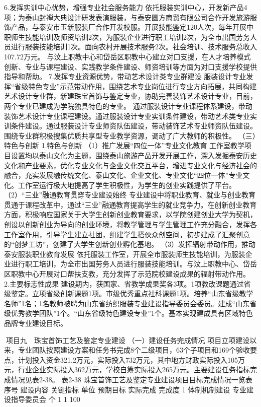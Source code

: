 6.发挥实训中心优势，增强专业社会服务能力
依托服装实训中心，开发新产品4项；为泰山封禅大典设计研发表演服装，与泰安圆方商贸有限公司合作开发旅游服饰产品，与泰安市玉新服装厂合作开发校服。开展技能鉴定120人次，每年开展中职师生技能培训及师资培训2次，为服装企业进行职工培训2次，为全市出国劳务人员进行服装技能培训1次。面向农村开展技术服务2次。社会培训、技术服务总收入107.72万元。
与汶上职教中心和岱岳区职教中心建立对口支援，在人才培养模式创新、专业与课程建设、实践教学条件建设、师资培训等方面为对口支援学校提供指导和帮助。
7.发挥专业资源优势，带动艺术设计类专业群建设
服装设计专业发挥“省级特色专业”示范带动作用，围绕艺术专业岗位进行专业方向拓展，共同构建艺术设计专业群，新建珠宝首饰与鉴定专业，协助完善装饰艺术设计专业，目前，两个专业已建成为学院独具特色的专业。
通过服装设计专业课程体系建设，带动装饰艺术设计专业课程建设。通过服装设计专业实训条件建设，带动艺术类专业实训条件建设。通过服装设计专业师资队伍建设，带动装饰艺术专业师资队伍建设。围绕专业群积极搜集优质共享型专业教学资源，调动了广大教师的积极性。
（三）特色与创新
1.特色与创新
（1）推广发展“四位一体”专业文化教育
工作室教学项目设置均以泰山文化为主题，围绕泰山旅游产品开发开展工作，深入发掘泰安历史文化和产业要素，优化专业文化与企业文化交互平台，增进专业文化与经济社会的融合，充实发展融传统文化、泰山文化、企业文化、专业文化“四位一体”专业文化。工作室运行极大地提高了学生积极性，为学生的创业实践提供了平台。
（2）“三业”融通教育贯穿专业建设始终
专业建设中将职业教育、就业与创业教育贯通于课程改革中，通过“三业”融通教育提高学生的就业竞争力。在创新创业教育方面，积极响应国家关于大学生创新创业教育要求，以学院创建创业大学为契机，创设以创新创业为导向的创业环境，将教学管理与学生管理工作充分融合，发挥各工作室作用，引导学生建立社团，组建学生搭伙众创空间，初步建成了汇聚创意的“创梦工坊”，创建了大学生创新创业孵化基地。
（3）发挥辐射带动作用，推动泰安服装职业教育发展
依托服装工作室，开展全市服装师生技能培训，为服装企业进行职工培训，为全市出国劳务人员进行服装技能培训。与汶上职教中心、岱岳区职教中心开展对口帮扶支教，充分发挥了示范院校建设成果的辐射带动作用。
2.主要标志性成果
建设期内，获国家、省教学成果奖各3项。1项教改课题通过省级鉴定。立项省级创新课题1项。市级优秀重点社科课题1项。培养“山东省级教学名师”1名；1名教师被聘为山东省纺织服装专业建设指导委员会委员。建成“山东省级优秀教学团队”1个。“山东省级特色建设专业”1个。基本实现建成具有区域特色品牌专业建设目标。

项目九　珠宝首饰工艺及鉴定专业建设
（一）建设任务完成情况
项目立项建设以来，专业团队按照建设方案和任务书完成8个二级项目，63个子项目和169个验收要点，计划投入资金321.2万元，实际投入732万元，其中地方财政实际投入105万元，行业企业实际投入362万元，学校自筹实际投入265万元。主要建设任务指标完成情况见表2-38。
表2-38  珠宝首饰工艺及鉴定专业建设项目目标完成情况一览表
序号
建设内容
关键指标
单位
预期目标
实际完成
完成度
1
体制机制建设
专业建设指导委员会
个
1
1
100%


